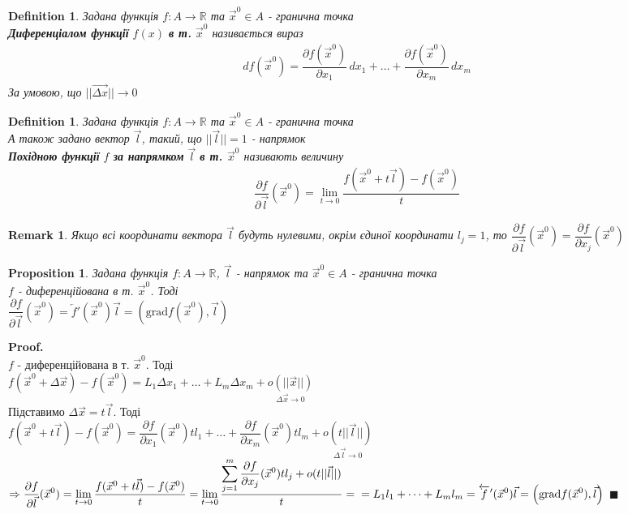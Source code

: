 \documentclass[a4paper, 14pt]{extarticle}
\def\huge{\displaystyle}
\theoremstyle{theoremdd}
\theoremstyle{theoremdd}
\newtheorem{definition}[theorem]{Definition}
\theoremstyle{theoremdd}
\theoremstyle{theoremdd}
\theoremstyle{theoremdd}
\newtheorem{proposition}[theorem]{Proposition}
\theoremstyle{theoremdd}
\newtheorem{remark}[theorem]{Remark}
\theoremstyle{theoremdd}
\theoremstyle{theoremdd}
\newenvironment{pf}{\vspace*{-3mm} \textbf{Proof. \\}}{$\blacksquare$}
\begin{document}
\begin{definition}
Задана функція $f: A \to \mathbb{R}$ та $\vec{x}^0 \in A$ - гранична точка\\
\textbf{Диференціалом функції} $f(x)$ \textbf{в т.} $\vec{x}^0$ називається вираз
\begin{align*}
df(\vec{x}^0) = \dfrac{\partial f(\vec{x}^0)}{\partial x_1}\,dx_1 + \dots + \dfrac{\partial f(\vec{x}^0)}{\partial x_m}\,dx_m
\end{align*}
За умовою, що $||\overrightarrow{\Delta x}|| \to 0$
\end{definition}

\begin{definition}
Задана функція $f: A \to \mathbb{R}$ та $\vec{x}^0 \in A$ - гранична точка\\
А також задано вектор $\vec{l}$, такий, що $||\vec{l}|| = 1$ - напрямок\\
\textbf{Похідною функції} $f$ \textbf{за напрямком} $\vec{l}$ \textbf{в т. $\vec{x}^0$} називають величину
\begin{align*}
\dfrac{\partial f}{\partial \vec{l}} (\vec{x}^0) = \lim_{t \to 0} \dfrac{f(\vec{x}^0+t \vec{l}) - f(\vec{x}^0)}{t}
\end{align*}
\end{definition}

\begin{remark}
Якщо всі координати вектора $\vec{l}$ будуть нулевими, окрім єдиної координати $l_j = 1$, то $\dfrac{\partial f}{\partial \vec{l}} (\vec{x}^0) = \dfrac{\partial f}{\partial x_j} (\vec{x}^0)$
\end{remark}

\begin{proposition}
Задана функція $f: A \to \mathbb{R}$, $\vec{l}$ - напрямок та $\vec{x}^0 \in A$ - гранична точка\\
$f$ - диференційована в т. $\vec{x}^0$. Тоді\\
$\dfrac{\partial f}{\partial \vec{l}}(\vec{x}^0) = \overleftarrow{f}'(\vec{x}^0) \vec{l} = \left(\textrm{grad} f(\vec{x}^0), \vec{l} \right)$
\end{proposition}
\begin{pf}
$f$ - диференційована в т. $\vec{x}^0$. Тоді \\ $f(\vec{x}^0 + \Delta \vec{x}) - f(\vec{x}^0) = L_1 \Delta x_1 + \dots + L_m \Delta x_m + \underset{\Delta \vec{x} \to 0}{o(||\vec{x}||)}$\\
Підставимо $\Delta \vec{x} = t \vec{l}$. Тоді\\
$f(\vec{x}^0 + t \vec{l}) - f(\vec{x}^0) = \dfrac{\partial f}{\partial x_1} (\vec{x}^0) tl_1 + \dots + \dfrac{\partial f}{\partial x_m} (\vec{x}^0) t l_m + \underset{\Delta \vec{l} \to 0}{o(t || \vec{l}||)}$\\
$\Rightarrow \huge \dfrac{\partial f}{\partial \vec{l}}(\vec{x}^0) = \lim_{t \to 0} \dfrac{f(\vec{x}^0 + t \vec{l}) - f(\vec{x}^0)}{t} = \lim_{t \to 0} \dfrac{\huge \sum_{j=1}^m \dfrac{\partial f}{\partial x_j}(\vec{x}^0)tl_j + o(t||\vec{l}||)}{t} = \\ = L_1 l_1 + \dots + L_m l_m = \overleftarrow{f}'(\vec{x}^0) \vec{l} = \left( \textrm{grad} f(\vec{x}^0), \vec{l} \right)$
\end{pf}
\end{document}
